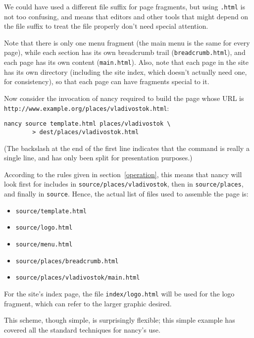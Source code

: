 \documentclass[english]{scrartcl}
\begin{document}
We could have used a different file suffix for page fragments, but
using \texttt{.html} is not too confusing, and means that editors and
other tools that might depend on the file suffix to treat the file
properly don't need special attention.

Note that there is only one menu fragment (the main menu is the same
for every page), while each section has its own breadcrumb trail
(\texttt{breadcrumb.html}), and each page has its own content
(\texttt{main.html}). Also, note that each page in the site has its
own directory (including the site index, which doesn't actually need
one, for consistency), so that each page can have fragments special to
it.

Now consider the invocation of nancy required to build the page whose
URL is \verb|http://www.example.org/places/vladivostok.html|:

\begin{verbatim}
nancy source template.html places/vladivostok \
        > dest/places/vladivostok.html
\end{verbatim}

(The backslash at the end of the first line indicates that the command
is really a single line, and has only been split for presentation
purposes.)

According to the rules given in section~\ref{operation}, this means
that nancy will look first for includes in
\texttt{source/places/vladivostok}, then in \texttt{source/places},
and finally in \texttt{source}. Hence, the actual list of files used
to assemble the page is:

\begin{itemize}
\item \texttt{source/template.html}
\item \texttt{source/logo.html}
\item \texttt{source/menu.html}
\item \texttt{source/places/breadcrumb.html}
\item \texttt{source/places/vladivostok/main.html}
\end{itemize}

For the site's index page, the file \texttt{index/logo.html} will be
used for the logo fragment, which can refer to the larger graphic
desired.

This scheme, though simple, is surprisingly flexible; this simple
example has covered all the standard techniques for nancy's use.
\end{document}
